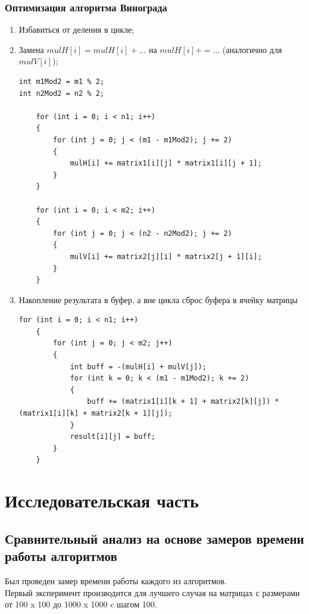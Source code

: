 \documentclass[12pt]{report}
\begin{document}
\subsection{Оптимизация алгоритма Винограда}
\begin{enumerate}
	\item Избавиться от деления в цикле;
	\item Замена $mulH[i] = mulH[i] + …$ на $mulH[i] += …$ (аналогично для $mulV[i]$);
	\begin{lstlisting}[label=some-code,caption=Оптимизации алгоритма Винограда №1 и №2]
int m1Mod2 = m1 % 2;
int n2Mod2 = n2 % 2;

	for (int i = 0; i < n1; i++)
	{
		for (int j = 0; j < (m1 - m1Mod2); j += 2)
		{
			mulH[i] += matrix1[i][j] * matrix1[i][j + 1];
		}
	}

	for (int i = 0; i < m2; i++)
	{
		for (int j = 0; j < (n2 - n2Mod2); j += 2)
		{
			mulV[i] += matrix2[j][i] * matrix2[j + 1][i];
		}
	}
\end{lstlisting}

	\item Накопление результата в буфер, а вне цикла сброс буфера в ячейку матрицы
	\begin{lstlisting}[label=some-code,caption=Оптимизации алгоритма Винограда №3]
for (int i = 0; i < n1; i++)
	{
		for (int j = 0; j < m2; j++)
		{
			int buff = -(mulH[i] + mulV[j]);
			for (int k = 0; k < (m1 - m1Mod2); k += 2)
			{
				buff += (matrix1[i][k + 1] + matrix2[k][j]) * (matrix1[i][k] + matrix2[k + 1][j]);
			}
			result[i][j] = buff;
		}
	}
\end{lstlisting}

\end{enumerate}




\chapter{Исследовательская часть}

\section{Сравнительный анализ на основе замеров времени работы алгоритмов}

Был проведен замер времени работы каждого из алгоритмов.\\
Первый эксперимент производится для лучшего случая на матрицах с размерами от 100 x 100 до 1000 x 1000 c шагом 100. \\
\end{document}
